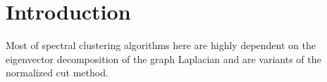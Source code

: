 \section{Introduction}
Most of spectral clustering algorithms here are highly dependent on the eigenvector decomposition of the graph Laplacian and are variants of the normalized cut method.
